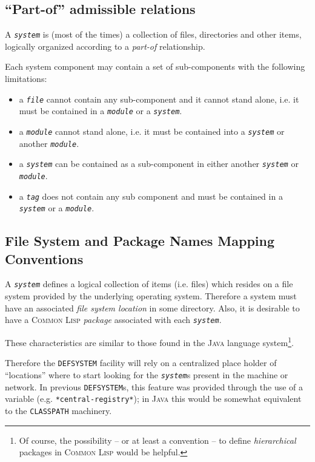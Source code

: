 \documentclass[a4paper]{article}
\newcommand{\CL}{\textsc{Common Lisp}}
\newcommand{\Java}{\textsc{Java}}
\newcommand{\DEFSYSTEM}{\texttt{DEFSYSTEM}}
\newcommand{\marginnote}[1]{%
\marginpar{\begin{small}\begin{em}
\raggedright #1
\end{em}\end{small}}}
\newcommand{\code}[1]{\texttt{#1}}
\newcommand{\object}[1]{\texttt{\textit{#1}}} %
\begin{document}
\subsection{``Part-of'' admissible relations}

A \object{system} is (most of the times) a collection of files,
directories and other items, logically organized according to a \emph{part-of}
relationship.

Each system component may contain a set of sub-components with the
following limitations:
\begin{itemize}
\item	a \object{file} cannot contain any sub-component\marginnote{Or
	maybe it should be allowed to?} and it cannot stand alone,
	i.e. it must be contained in a \object{module} or a \object{system}.
\item	a \object{module} cannot stand alone, i.e. it must be
	contained into a \object{system} or another \object{module}.
\item	a \object{system} can be contained as a sub-component in
	either another \object{system} or \object{module}.
\item	a \object{tag} does not contain any sub component and must be
	contained in a \object{system} or a \object{module}.
\end{itemize}

\subsection{File System and Package Names Mapping Conventions}

A \object{system} defines a logical collection of items (i.e. files)
which resides on a file system provided by the underlying operating
system. Therefore a system must have an associated \emph{file system
location} in some directory. Also, it is desirable to have a \CL{}
\emph{package} associated with each \object{system}.

These characteristics are similar to those found in the \Java{}
language system\footnote{Of course, the possibility -- or at least a
convention -- to define \emph{hierarchical} packages in \CL{} would be
helpful.}.

Therefore the \DEFSYSTEM{} facility will rely on a centralized place
holder of ``locations'' where to start looking for the
\object{system}s present in the machine or network. In previous
\DEFSYSTEM{}s, this feature was provided through the use of a variable
(e.g. \code{*central-registry*}); in \Java{} this would be somewhat
equivalent to the \code{CLASSPATH} machinery.
\end{document}
